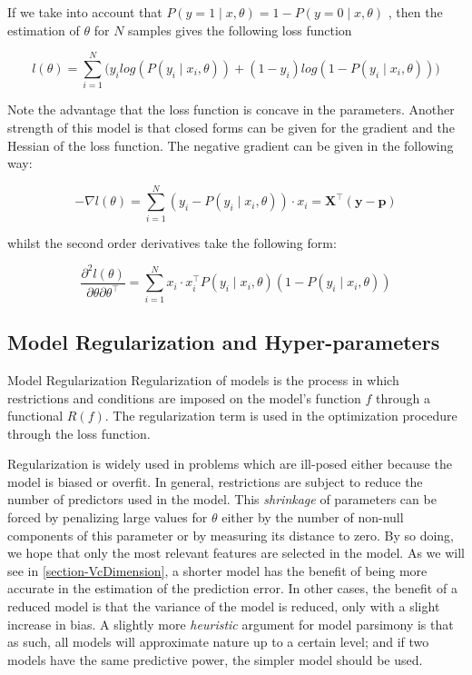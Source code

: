 If we take into account that $P(y=1 \mid x,\theta) = 1 - P(y=0 \mid x,\theta)$ , then the estimation of $\theta$ for $N$ samples gives the following loss function

\begin{equation}
l(\theta) = \sum_{i=1}^N \big(y_i log(P(y_i \mid x_i,\theta)) + (1-y_i)log(1 - P(y_i \mid x_i,\theta) ) \big)
\end{equation}

Note the advantage that the loss function is concave in the parameters. Another strength of this model is that closed forms can be given for the gradient and the Hessian of the loss function. The negative gradient can be given in the following way: %

\begin{equation}
- \nabla  l(\theta) = \sum_{i=1}^N (y_i - P(y_i \mid x_i,\theta))\cdot x_i = \textbf{X}^{\intercal}(\textbf{y}-\textbf{p})
\end{equation}

whilst the second order derivatives take the following form:

\begin{equation}
\frac{\partial^2 l(\theta)}{\partial \theta \partial \theta^\intercal} = \sum_{i=1}^N x_i \cdot x_i^\intercal P(y_i \mid x_i,\theta)(1 -P(y_i \mid x_i,\theta))
\end{equation}



\subsection{Model Regularization and Hyper-parameters} \label{subsection-hyperParametersRegularization}


\begin{definition}{Model Regularization}
Regularization of models is the process in which restrictions and conditions are imposed on the model's function $f$ through a functional $ R(f)$. The regularization term is used in the optimization procedure through the loss function.
\end{definition}

Regularization is widely used in problems which are ill-posed either because the model is biased or overfit. In general, restrictions are subject to reduce the number of predictors used in the model. This \textit{shrinkage} of parameters can be forced by penalizing large values for $\theta$ either by the number of non-null components of this parameter or by measuring its distance to zero. By so doing, we hope that only the most relevant features are selected in the model. As we will see in \ref{section-VcDimension}, a shorter model has the benefit of being more accurate in the estimation of the prediction error. In other cases, the benefit of a reduced model is that the variance of the model is reduced, only with a slight increase in bias. A slightly more \textit{heuristic} argument for model parsimony is that as such, all models will approximate nature up to a certain level; and if two models have the same predictive power, the simpler model should be used.


